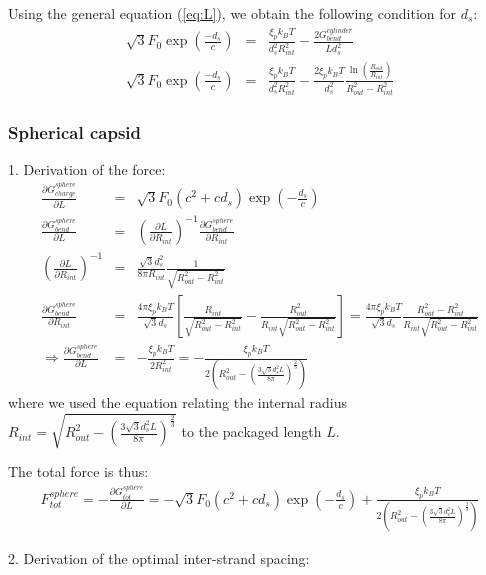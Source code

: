 \documentclass{article}
\begin{document}
Using the general equation (\ref{eq:L}), we obtain the following condition for $d_s$:
\begin{eqnarray*}
\sqrt{3}F_0 \exp{ \left( \frac{-d_s}{c} \right)} &=& \frac{\xi_p k_B T}{d_s^2 R_{int}^2 } - \frac{2 G_{bend}^{cylinder}}{Ld_s^2} \\
\sqrt{3}F_0 \exp{ \left( \frac{-d_s}{c} \right)} &=& \frac{\xi_p k_B T}{d_s^2 R_{int}^2 } - \frac{2\xi_p k_B T}{d_s^2}\frac{\ln(\frac{R_{out}}{R_{int}})}{R_{out}^2 - R_{int}^2}
\end{eqnarray*}

\subsubsection*{Spherical capsid}
1. Derivation of the force:
\begin{eqnarray*}
 \frac{\partial G_{charge}^{sphere}}{\partial L} & = &  \sqrt{3}F_0(c^2 + cd_s)\exp(-\frac{d_s}{c}) \\
 \frac{\partial G_{bend}^{sphere}}{\partial L} & = & \left( \frac{\partial L}{\partial R_{int}} \right)^{-1} \frac{\partial G_{bend}^{sphere}}{\partial R_{int}} \\
 \left( \frac{\partial L}{\partial R_{int}}\right)^{-1}  & = & \frac{\sqrt{3}d_s^2}{8\pi R_{int}}\frac{1}{\sqrt{R_{out}^2 - R_{int}^2}} \\
 \frac{\partial G_{bend}^{sphere}}{\partial R_{int}} & = & \frac{4\pi\xi_pk_BT}{\sqrt{3}d_s}[\frac{R_{int}}{\sqrt{R_{out}^2 - R_{int}^2}} - \frac{R_{out}^2}{R_{int}\sqrt{R_{out}^2 - R_{int}^2}}] = \frac{4\pi\xi_pk_BT}{\sqrt{3}d_s} \frac{R_{out}^2 - R_{int}^2}{R_{int}\sqrt{R_{out}^2 - R_{int}^2}}  \\
 \Rightarrow  \frac{\partial G_{bend}^{sphere}}{\partial L} & = & -\frac{\xi_pk_BT}{2R_{int}^2} =-\frac{\xi_pk_BT}{2(R_{out}^2 - (\frac{3\sqrt{3}d_s^2L}{8\pi})^\frac23)}
\end{eqnarray*}
where we used the equation relating the internal radius $R_{int} = \sqrt{R_{out}^2 - (\frac{3\sqrt{3}d_s^2L}{8\pi})^\frac23}$ to the packaged length $L$.

The total force is thus:
\begin{eqnarray*}
    F_{tot}^{sphere} = - \frac{\partial G_{tot}^{sphere}}{\partial L}= -\sqrt{3}F_0(c^2 + cd_s)\exp(-\frac{d_s}{c}) + \frac{\xi_pk_BT}{2(R_{out}^2 - (\frac{3\sqrt{3}d_s^2L}{8\pi})^\frac23)}
\end{eqnarray*}

2. Derivation of the optimal inter-strand spacing:
\end{document}
